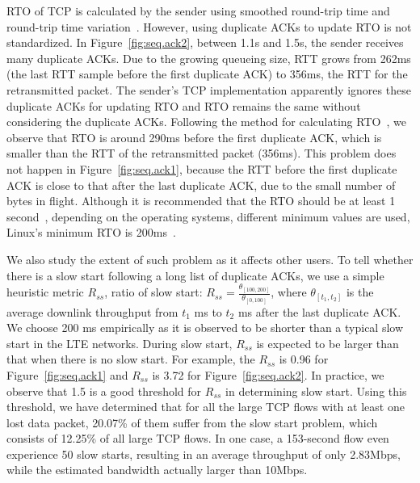 RTO of TCP is calculated by the sender using smoothed round-trip time and round-trip time variation~\cite{rfc6298}. However, using duplicate ACKs to update RTO is not standardized. In Figure~\ref{fig:seq.ack2}, between 1.1s and 1.5s, the sender receives many duplicate ACKs. Due to the growing queueing size, RTT grows from 262ms (the last RTT sample before the first duplicate ACK) to 356ms, the RTT for the retransmitted packet. The sender's TCP implementation apparently ignores these duplicate ACKs for updating RTO and RTO remains the same without considering the duplicate ACKs. Following the method for calculating RTO~\cite{rfc6298}, we observe that RTO is around 290ms before the first duplicate ACK, which is smaller than the RTT of the retransmitted packet (356ms). This problem does not happen in Figure~\ref{fig:seq.ack1}, because the RTT before the first duplicate ACK is close to that after the last duplicate ACK, due to the small number of bytes in flight. Although it is recommended that the RTO should be at least 1 second~\cite{rfc6298}, depending on the operating systems, different minimum values are used, \eg Linux's minimum RTO is 200ms~\cite{linuxrto}.

We also study the extent of such problem as it affects other users. To tell whether there is a slow start following a long list of duplicate ACKs, we use a simple heuristic metric $R_{ss}$, ratio of slow start:
$R_{ss} = \frac{\theta_{[100, 200]}}{\theta_{[0, 100]}}$,
where $\theta_{[t_{1}, t_{2}]}$ is the average downlink throughput from $t_{1}$ ms to $t_{2}$ ms after the last duplicate ACK. We choose 200 ms empirically as it is observed to be shorter than a typical slow start in the LTE networks. During slow start, $R_{ss}$ is expected to be larger than that when there is no slow start. For example, the $R_{ss}$ is 0.96 for Figure~\ref{fig:seq.ack1} and $R_{ss}$ is 3.72 for Figure~\ref{fig:seq.ack2}. In practice, we observe that 1.5 is a good threshold for $R_{ss}$ in determining slow start. Using this threshold, we have determined that for all the large TCP flows with at least one lost data packet, 20.07\% of them suffer from the slow start problem, which consists of 12.25\% of all large TCP flows. In one case, a 153-second flow even experience 50 slow starts, resulting in an average throughput of only 2.83Mbps, while the estimated bandwidth actually larger than 10Mbps.

